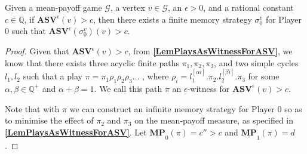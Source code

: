 \begin{lemma}
\label{LemFinMemWitnessASV}
Given a mean-payoff game $\mathcal{G}$, a vertex $v \in \mathcal{G}$, an $\epsilon > 0$, and a rational constant $c \in \mathbb{Q}$, if $\mathbf{ASV}^{\epsilon}(v) > c$, then there exists a finite memory strategy $\sigma_0^v$ for Player 0 such that $\mathbf{ASV}^{\epsilon}(\sigma_0^v)(v) > c$.
\end{lemma}

\begin{proof}
Given that $\mathbf{ASV}^{\epsilon}(v) > c$, from \textbf{\cref{LemPlaysAsWitnessForASV}}, we know that there exists three acyclic finite paths $\pi_1, \pi_2, \pi_3$, and two simple cycles $l_1, l_2$ such that a play $\pi = \pi_1\rho_1\rho_2\rho_3\dots$ , where $\rho_i = l_1^{[\alpha i]}.\pi_2.l_2^{[\beta i]}.\pi_3$ for some $\alpha, \beta \in \mathbb{Q}^{+}$ and $\alpha + \beta = 1$. 
We call this path $\pi$ an  $\epsilon$-witness for $\mathbf{ASV}^{\epsilon}(v) > c$.

Note that with $\pi$ we can construct an infinite memory strategy for Player 0 so as to minimise the effect of $\pi_2$ and $\pi_3$ on the mean-payoff measure, as specified in \textbf{\cref{LemPlaysAsWitnessForASV}}.
Let $\underline{\mathbf{MP}}_0(\pi) = c'' > c$ and $\underline{\mathbf{MP}}_1(\pi) = d$.


\end{proof}
